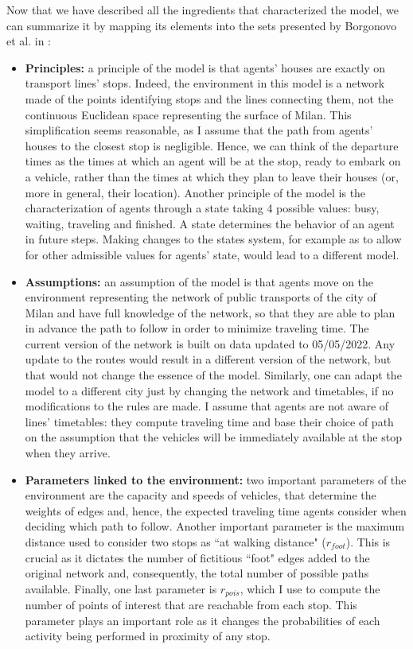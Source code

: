 Now that we have described all the ingredients that characterized the model, we can summarize it by mapping its elements into the sets presented by Borgonovo et al. in \cite{Borgonovo2022SensitivityAO}:
\begin{itemize}
\item \textbf{Principles:} a principle of the model is that agents' houses are exactly on transport lines' stops. Indeed, the environment in this model is a network made of the points identifying stops and the lines connecting them, not the continuous Euclidean space representing the surface of Milan. This simplification seems reasonable, as I assume that the path from agents' houses to the closest stop is negligible. Hence, we can think of the departure times as the times at which an agent will be at the stop, ready to embark on a vehicle, rather than the times at which they plan to leave their houses (or, more in general, their location). Another principle of the model is the characterization of agents through a state taking 4 possible values: busy, waiting, traveling and finished. A state determines the behavior of an agent in future steps. Making changes to the states system, for example as to allow for other admissible values for agents' state, would lead to a different model. 
\item \textbf{Assumptions:} an assumption of the model is that agents move on the environment representing the network of public transports of the city of Milan and have full knowledge of the network, so that they are able to plan in advance the path to follow in order to minimize traveling time. The current version of the network is built on data updated to 05/05/2022. Any update to the routes would result in a different version of the network, but that would not change the essence of the model. Similarly, one can adapt the model to a different city just by changing the network and timetables, if no modifications to the rules are made. I assume that agents are not aware of lines' timetables: they compute traveling time and base their choice of path on the assumption that the vehicles will be immediately available at the stop when they arrive.
\item \textbf{Parameters linked to the environment:} two important parameters of the environment are the capacity and speeds of vehicles, that determine the weights of edges and, hence, the expected traveling time agents consider when deciding which path to follow. Another important parameter is the maximum distance used to consider two stops as ``at walking distance" ($r_{foot}$). This is crucial as it dictates the number of fictitious ``foot" edges added to the original network and, consequently, the total number of possible paths available. Finally, one last parameter is $r_{pois}$, which I use to compute the number of points of interest that are reachable from each stop. This parameter plays an important role as it changes the probabilities of each activity being performed in proximity of any stop.

\end{itemize}
